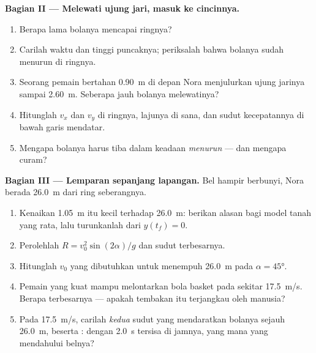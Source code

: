 \begin{problem}
\medskip\noindent\textbf{Bagian II --- Melewati ujung jari, masuk ke cincinnya.}
\begin{enumerate}[resume]
  \item Berapa lama bolanya mencapai ringnya?
  \item Carilah waktu dan tinggi puncaknya; periksalah bahwa bolanya sudah
        menurun di ringnya.
  \item Seorang pemain bertahan \qty{0.90}{m} di depan Nora menjulurkan ujung
        jarinya sampai \qty{2.60}{m}. Seberapa jauh bolanya melewatinya?
  \item Hitunglah $v_x$ dan $v_y$ di ringnya, lajunya di sana, dan sudut
        kecepatannya di bawah garis mendatar.
  \item Mengapa bolanya harus tiba dalam keadaan \emph{menurun} --- dan mengapa curam?
\end{enumerate}

\medskip\noindent\textbf{Bagian III --- Lemparan sepanjang lapangan.} Bel
hampir berbunyi, Nora berada \qty{26.0}{m} dari ring seberangnya.
\begin{enumerate}[resume]
  \item Kenaikan \qty{1.05}{m} itu kecil terhadap \qty{26.0}{m}: berikan
        alasan bagi model tanah yang rata, lalu turunkanlah 
        dari $y(t_f) = 0$.
  \item Perolehlah $R = v_0^2\sin(2\alpha)/g$ dan sudut  terbesarnya.
  \item Hitunglah $v_0$ yang dibutuhkan untuk menempuh \qty{26.0}{m} pada
        $\alpha = \ang{45}$.
  \item Pemain yang kuat mampu melontarkan bola basket pada sekitar
        \qty{17.5}{m/s}. Berapa  terbesarnya --- apakah tembakan itu
        terjangkau oleh manusia?
  \item Pada \qty{17.5}{m/s}, carilah \emph{kedua} sudut yang mendaratkan
        bolanya sejauh \qty{26.0}{m}, beserta : dengan
        \qty{2.0}{s} tersisa di jamnya, yang mana yang mendahului belnya?
\end{enumerate}


\end{problem}
